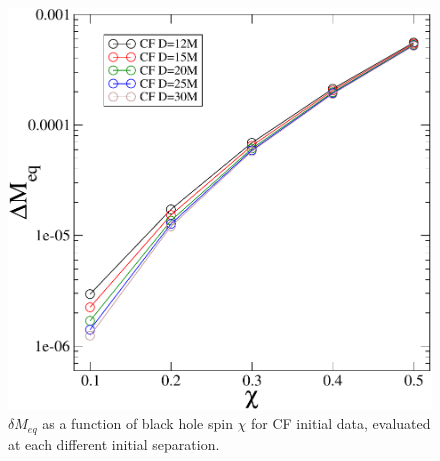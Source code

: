 \documentclass[aps,prd,amsmath,floatfix,twocolumn,superscriptaddress,nofootinbib,showpacs]{revtex4-1}
\theoremstyle{plain}
\theoremstyle{definition}
\newcommand{\note}[1]{\textcolor{Red}{[#1]}}
\begin{document}
\begin{figure}[!htbp]
\includegraphics[scale=0.50]{MvsS2}
 \caption{$\delta M_{eq}$ as a function of black hole spin $\chi$ for CF
    initial data, evaluated at each different initial separation.}
  \label{fig:MvsS}
\end{figure}





\end{document}
